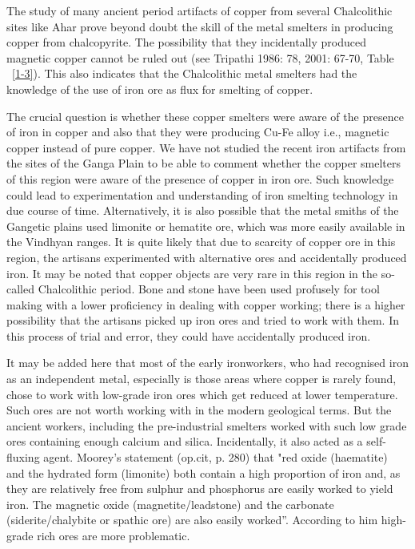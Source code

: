 The study of many ancient period artifacts of copper from several Chalcolithic sites like Ahar prove beyond doubt the skill of the metal smelters in producing copper from chalcopyrite. The possibility that they incidentally produced magnetic copper cannot be ruled out (see Tripathi 1986: 78, 2001: 67-70, Table ~\ref{1-3}). This also indicates that the Chalcolithic metal smelters had the knowledge of the use of iron ore as flux for smelting of copper. 

The crucial question is whether these copper smelters were aware of the presence of iron in copper and also that they were producing Cu-Fe alloy i.e., magnetic copper instead of pure copper. We have not studied the recent iron artifacts from the sites of the Ganga Plain to be able to comment whether the copper smelters of this region were aware of the presence of copper in iron ore. Such knowledge could lead to experimentation and understanding of iron smelting technology in due course of time. Alternatively, it is also possible that the metal smiths of the Gangetic plains used limonite or hematite ore, which was more easily available in the Vindhyan ranges. It is quite likely that due to scarcity of copper ore in this region, the artisans experimented with alternative ores and accidentally produced iron. It may be noted that copper objects are very rare in this region in the so-called Chalcolithic period. Bone and stone have been used profusely for tool making with a lower proficiency in dealing with copper working; there is a higher possibility that the artisans picked up iron ores and tried to work with them. In this process of trial and error, they could have accidentally produced iron.

It may be added here that most of the early ironworkers, who had recognised iron as an independent metal, especially is those areas where copper is rarely found, chose to work with low-grade iron ores which get reduced at lower temperature. Such ores are not worth working with in the modern geological terms. But the ancient workers, including the pre-industrial smelters worked with such low grade ores containing enough calcium and silica. Incidentally, it also acted as a self-fluxing agent. Moorey's statement (op.cit, p. 280) that "red oxide (haematite) and the hydrated form (limonite) both contain a high proportion of iron and, as they are relatively free from sulphur and phosphorus are easily worked to yield iron. The magnetic oxide (magnetite/leadstone) and the carbonate (siderite/chalybite or spathic ore) are also easily worked”. According to him high-grade rich ores are more problematic.

